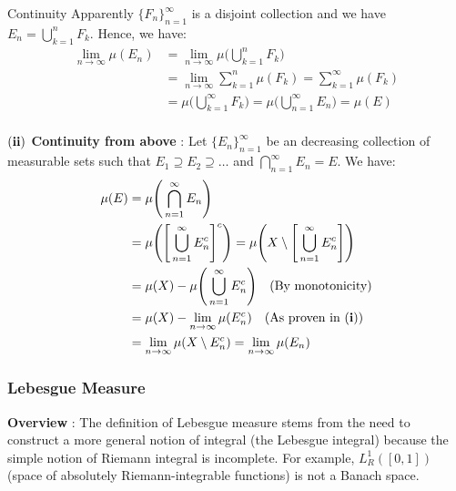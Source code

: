 \begin{proof*}
\begin{subproof}{\newline Continuity}
        \noindent Apparently $\{F_n\}_{n=1}^\infty$ is a disjoint collection and we have $E_n = \bigcup_{k=1}^n F_k$. Hence, we have:
        \begin{align*}
            \lim_{n\to\infty} \mu(E_n) 
                &= \lim_{n\to\infty} \mu\Bigg(\bigcup_{k=1}^n F_k\Bigg) \\
                &= \lim_{n\to\infty} \sum_{k=1}^n \mu(F_k) = \sum_{k=1}^\infty \mu(F_k) \\
                &= \mu\Bigg( \bigcup_{k=1}^\infty F_k \Bigg) = \mu\Bigg( \bigcup_{n=1}^\infty E_n \Bigg) = \mu(E) \\
        \end{align*}

        \noindent \textbf{$\bf (ii)$ Continuity from above} : Let $\{E_n\}_{n=1}^\infty$ be an decreasing collection of measurable sets such that $E_1\supseteq E_2 \supseteq \dots$ and $\bigcap_{n=1}^\infty E_n = E$. We have:
        \begin{align*}
            \mu(E) &= \mu\Bigg( \bigcap_{n=1}^\infty E_n \Bigg) \\
            &= \mu\Bigg( \Bigg[ \bigcup_{n=1}^\infty E_n^c\Bigg]^c \Bigg) = \mu\Bigg( X \setminus \Bigg[ \bigcup_{n=1}^\infty E_n^c\Bigg] \Bigg) \\
            &= \mu(X) - \mu\Bigg( \bigcup_{n=1}^\infty E_n^c \Bigg) \ \ \ \text{(By monotonicity)} \\
            &= \mu(X) - \lim_{n\to\infty} \mu(E_n^c) \ \ \ \text{(As proven in $\bf (i)$)} \\
            &= \lim_{n\to\infty} \mu(X\setminus E_n^c) = \lim_{n\to\infty} \mu(E_n)
        \end{align*}
    \end{subproof}
\end{proof*}




\subsubsection{Lebesgue Measure}
\noindent \textbf{Overview} : The definition of Lebesgue measure stems from the need to construct a more general notion of integral (the Lebesgue integral) because the simple notion of Riemann integral is incomplete. For example, $L^1_R([0,1])$ (space of absolutely Riemann-integrable functions) is not a Banach space.

